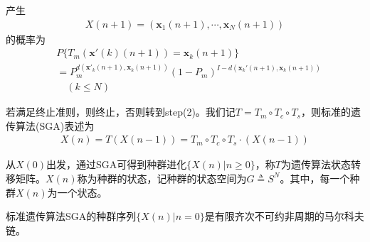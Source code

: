         产生
        \begin{align*}
        X(n+1)=(\mathbf{x}_1(n+1),\cdots,\mathbf{x}_N(n+1))
        \end{align*}
        的概率为
        \begin{align*}
        &P\{T_m\left(\mathbf{x}'(k)(n+1)\right)=\mathbf{x}_k(n+1)\}\\
        &=P_m^{d(\mathbf{x}'_k(n+1),\mathbf{x}_k(n+1))}(1-P_m)^{I-d(\mathbf{x}_k'(n+1),\mathbf{x}_k(n+1))}\\
        &\quad (k\leqslant N)
        \end{align*}
        \par
        若满足终止准则，则终止，否则转到step(2)。我们记$T=T_m\circ T_c \circ T_s$，则标准的遗传算法(SGA)表述为
        \begin{align*}
        X(n)=T\left(X(n-1)\right)=T_m\circ T_c \circ T_s\cdot \left(X(n-1)\right)
        \end{align*}
        \par
        从$X(0)$出发，通过SGA可得到种群进化$\{X(n)|n\geqslant 0\}$，称$T$为遗传算法状态转移矩阵。$X(n)$称为种群的状态，记种群的状态空间为$G\triangleq S^N$。其中，每一个种群$X(n)$为一个状态。
        \begin{theorem}
        标准遗传算法SGA的种群序列$\{X(n)|n=0\}$是有限齐次不可约非周期的马尔科夫链。
        \end{theorem}
